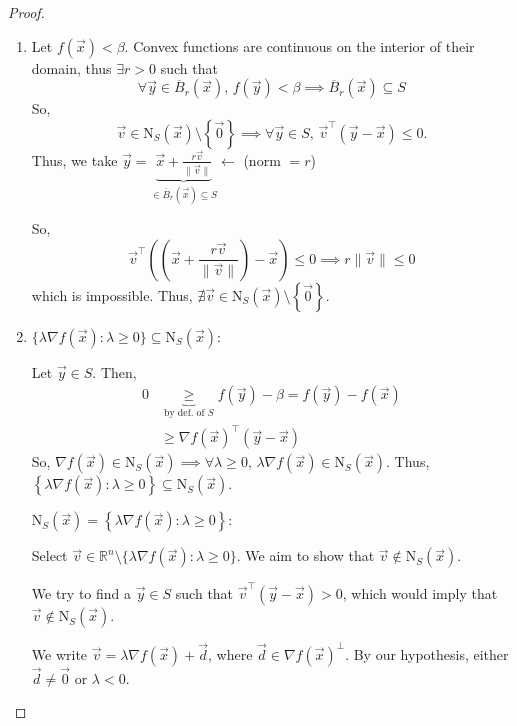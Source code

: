 \documentclass{article}
\newcommand{\R}{\mathbb{R}}
\begin{document}
\begin{proof}
    \begin{enumerate}[label=(\alph*)]
        \item Let $f(\vec{x}) < \beta$. Convex functions are continuous on the interior of their domain, thus $\exists r > 0$ such that
        \[
            \forall \vec{y} \in \overline{B}_r(\vec{x}),\, f(\vec{y}) < \beta \implies \overline{B}_r(\vec{x}) \subseteq S
        \]
        So,
        \[
            \vec{v} \in \text{N}_S(\vec{x}) \setminus \left\{\vec{0}\right\} \implies \forall \vec{y} \in S,\, \vec{v}^\top(\vec{y} - \vec{x}) \leq 0.
        \]
        Thus, we take $\vec{y} = \underbrace{\vec{x} + \frac{r\vec{v}}{\|\vec{v}\|}}_{\in \overline{B}_r(\vec{x}) \subseteq S} \leftarrow$ (norm $= r$)

        So,
        \[
            \vec{v}^\top\left(\left(\vec{x} + \frac{r\vec{v}}{\|\vec{v}\|}\right) - \vec{x}\right) \leq 0 \implies r\|\vec{v}\| \leq 0
        \]
        which is impossible. Thus, $\nexists \vec{v} \in \text{N}_S(\vec{x}) \setminus \left\{\vec{0}\right\}$.

        \item $\{\lambda\nabla f(\vec{x}) : \lambda \geq 0\} \subseteq \text{N}_S(\vec{x})$:

        Let $\vec{y} \in S$. Then,
        \begin{align*}
            0 &\underbrace{\geq}_{\text{by def. of } S} f(\vec{y}) - \beta = f(\vec{y}) - f(\vec{x}) \\
            &\geq \nabla f(\vec{x})^\top(\vec{y} - \vec{x}) \tag{subgradient inequality}
        \end{align*}
        So, $\nabla f(\vec{x}) \in \text{N}_S(\vec{x}) \implies \forall \lambda \geq 0,\, \lambda \nabla f(\vec{x}) \in \text{N}_S(\vec{x})$. Thus, $\left\{\lambda\nabla f(\vec{x}) : \lambda \geq 0\right\} \subseteq \text{N}_S(\vec{x})$.

        $\text{N}_S(\vec{x}) = \left\{\lambda\nabla f(\vec{x}) : \lambda \geq 0\right\}$:

        Select $\vec{v} \in \R^n \setminus \{\lambda\nabla f(\vec{x}) : \lambda \geq 0\}$. We aim to show that $\vec{v} \notin \text{N}_S(\vec{x})$.

        We try to find a $\vec{y} \in S$ such that $\vec{v}^\top(\vec{y} - \vec{x}) > 0$, which would imply that $\vec{v} \notin \text{N}_S(\vec{x})$.

        We write $\vec{v} = \lambda\nabla f(\vec{x}) + \vec{d}$, where $\vec{d} \in \nabla f(\vec{x})^\bot$. By our hypothesis, either $\vec{d} \neq \vec{0}$ or $\lambda < 0$.


\end{enumerate}
\end{proof}
\end{document}
